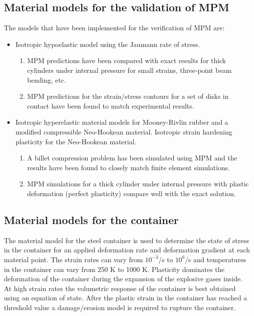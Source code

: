 \documentclass[10pt]{article}
\begin{document}
\subsection{Material models for the validation of MPM}
The models that have been implemented for the verification of MPM
are:
\begin{itemize}
   \item Isotropic hypoelastic model using the Jaumann rate of 
         stress.
     \begin{enumerate}
        \item  MPM predictions have been compared with exact results 
               for thick cylinders under internal pressure for small
               strains, three-point beam bending, etc.
        \item  MPM predictions for the strain/stress contours for
               a set of disks in contact have been found to match
               experimental results.
     \end{enumerate}
   \item Isotropic hyperelastic material models for Mooney-Rivlin
         rubber and a modified compressible Neo-Hookean material. 
         Isotropic strain hardening plasticity for the Neo-Hookean
         material.
     \begin{enumerate}
        \item  A billet compression problem has been simulated using
               MPM and the results have been found to closely 
               match finite element simulations.
        \item  MPM simulations for a thick cylinder under internal
               pressure with plastic deformation (perfect plasticity)
               compare well with the exact solution.
     \end{enumerate}
\end{itemize}

\subsection{Material models for the container}
The material model for the steel container is used to determine
the state of stress in the container for an applied deformation
rate and deformation gradient at each material point.  The strain 
rates can vary from $10^{-3}$/s to $10^6$/s and temperatures in 
the container can vary from 250 K to 1000 K.  Plasticity dominates
the deformation of the container during the expansion of the 
explosive gases inside.  At high strain rates the volumetric
response of the container is best obtained using an equation of 
state.  After the plastic strain in the container
has reached a threshold value a damage/erosion model is required to
rupture the container.
\end{document}
